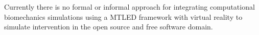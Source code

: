 Currently there is no formal or informal approach for integrating computational biomechanics simulations using a MTLED framework with virtual reality to simulate intervention in the open source and free software domain.


